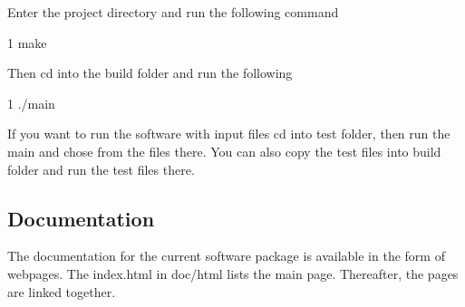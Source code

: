 Enter the project directory and run the following command 
\begin{DoxyCode}
1 make
\end{DoxyCode}
 Then cd into the build folder and run the following 
\begin{DoxyCode}
1 ./main
\end{DoxyCode}
 If you want to run the software with input files cd into test folder, then run the main and chose from the files there. You can also copy the test files into build folder and run the test files there.

\subsection*{Documentation}

The documentation for the current software package is available in the form of webpages. The index.\+html in doc/html lists the main page. Thereafter, the pages are linked together. 